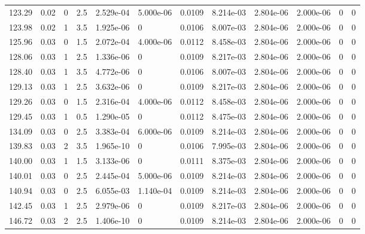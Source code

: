\documentclass[preview]{standalone}
\begin{document}
{{{\begin{tabular}{L{1.2cm}C{1.2cm} C{0.3cm}C{0.5cm} C{1.4cm}C{1.4cm} C{1.4cm}C{1.4cm} C{1.6cm}C{1.6cm} C{1.6cm}C{1.6cm}}
  123.29  &  0.02  & 0     & 2.5 &  2.529e-04  & 5.000e-06  &  0.0109&   8.214e-03& 2.804e-06 & 2.000e-06   &  0 & 0  \\ 
  123.98  &  0.02  & 1     & 3.5 &  1.925e-06  & 0  &  0.0106&   8.007e-03& 2.804e-06 & 2.000e-06   &  0 & 0  \\ 
  125.96  &  0.03  & 0     & 1.5 &  2.072e-04  & 4.000e-06  &  0.0112&   8.458e-03& 2.804e-06 & 2.000e-06   &  0 & 0  \\ 
  128.06  &  0.03  & 1     & 2.5 &  1.336e-06  & 0  &  0.0109&   8.217e-03& 2.804e-06 & 2.000e-06   &  0 & 0  \\ 
  128.40  &  0.03  & 1     & 3.5 &  4.772e-06  & 0  &  0.0106&   8.007e-03& 2.804e-06 & 2.000e-06   &  0 & 0  \\ 
  129.13  &  0.03  & 1     & 2.5 &  3.632e-06  & 0  &  0.0109&   8.217e-03& 2.804e-06 & 2.000e-06   &  0 & 0  \\ 
  129.26  &  0.03  & 0     & 1.5 &  2.316e-04  & 4.000e-06  &  0.0112&   8.458e-03& 2.804e-06 & 2.000e-06   &  0 & 0  \\ 
  129.45  &  0.03  & 1     & 0.5 &  1.290e-05  & 0  &  0.0112&   8.475e-03& 2.804e-06 & 2.000e-06   &  0 & 0  \\ 
  134.09  &  0.03  & 0     & 2.5 &  3.383e-04  & 6.000e-06  &  0.0109&   8.214e-03& 2.804e-06 & 2.000e-06   &  0 & 0  \\ 
  139.83  &  0.03  & 2     & 3.5 &  1.965e-10  & 0  &  0.0106&   7.995e-03& 2.804e-06 & 2.000e-06   &  0 & 0  \\ 
  140.00  &  0.03  & 1     & 1.5 &  3.133e-06  & 0  &  0.0111&   8.375e-03& 2.804e-06 & 2.000e-06   &  0 & 0  \\ 
  140.01  &  0.03  & 0     & 2.5 &  2.445e-04  & 5.000e-06  &  0.0109&   8.214e-03& 2.804e-06 & 2.000e-06   &  0 & 0  \\ 
  140.94  &  0.03  & 0     & 2.5 &  6.055e-03  & 1.140e-04  &  0.0109&   8.214e-03& 2.804e-06 & 2.000e-06   &  0 & 0  \\ 
  142.45  &  0.03  & 1     & 2.5 &  2.979e-06  & 0  &  0.0109&   8.217e-03& 2.804e-06 & 2.000e-06   &  0 & 0  \\ 
  146.72  &  0.03  & 2     & 2.5 &  1.406e-10  & 0  &  0.0109&   8.214e-03& 2.804e-06 & 2.000e-06   &  0 & 0  \\ 
\hline 
\end{tabular} 

}}}
\end{document}
